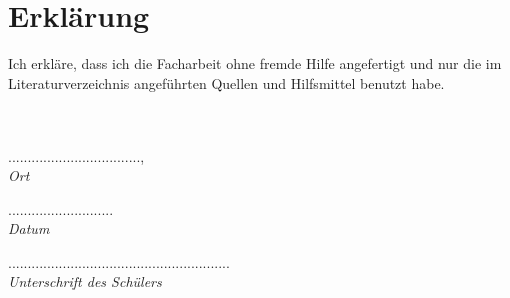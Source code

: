 \documentclass[a4paper, 12pt, bibtotocnumbered, liststotocnumbered]{scrartcl}
\begin{document}
	\pagebreak

	\nocite{*}
	
	

	\listoffigures
	\listsubcaptions

	\pagebreak

	\section*{Erklärung}
	Ich erkläre, dass ich die Facharbeit ohne fremde Hilfe angefertigt und nur die im Literaturverzeichnis angeführten Quellen und Hilfsmittel benutzt habe.\\
	\\
	\\
	\begin{minipage}{3cm}
		..................................,\\
		\it{Ort}
	\end{minipage}
	\hspace{1.5cm}
	\begin{minipage}{2cm}
		...........................\\
		\it{Datum}
	\end{minipage}
	\hspace{1.5cm}
	\begin{minipage}{8cm}
		.........................................................\\
		\it{Unterschrift des Schülers}
	\end{minipage}
\end{document}
